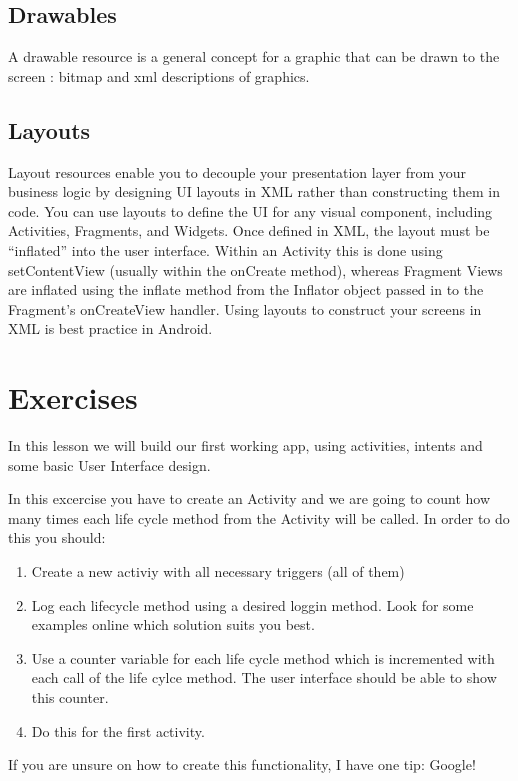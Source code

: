 \subsection{Drawables}
A drawable resource is a general concept for a graphic that can be drawn to the screen : bitmap and xml descriptions of graphics.
\subsection{Layouts}
Layout resources enable you to decouple your presentation layer from your business logic by designing UI layouts in XML rather than constructing them in code. You can use layouts to define the UI for any visual component, including Activities, Fragments, and Widgets. Once defined in XML, the layout must be “inflated” into the user interface. Within an Activity this is done using setContentView (usually within the onCreate method), whereas Fragment Views are inflated using the inflate method from the Inflator object passed in to the Fragment’s onCreateView handler. Using layouts to construct your screens in XML is best practice in Android.

\newpage
\section{Exercises}
In this lesson we will build our first working app, using activities, intents and some basic User Interface design.

\begin{exercise}
	In this excercise you have to create an Activity and we are going to count how many times each life cycle method from the Activity will be called. In order to do this you should:
	\begin{enumerate}
		\item Create a new activiy with all necessary triggers (all of them)
		\item Log each lifecycle method using a desired loggin method. Look for some examples online which solution suits you best.
		\item Use a counter variable for each life cycle method which is incremented with each call of the life cylce method. The user interface should be able to show this counter.
		\item Do this for the first activity. 
	\end{enumerate}
\label{ex:act1}
\end{exercise}

If you are unsure on how to create this functionality, I have one tip: Google!

